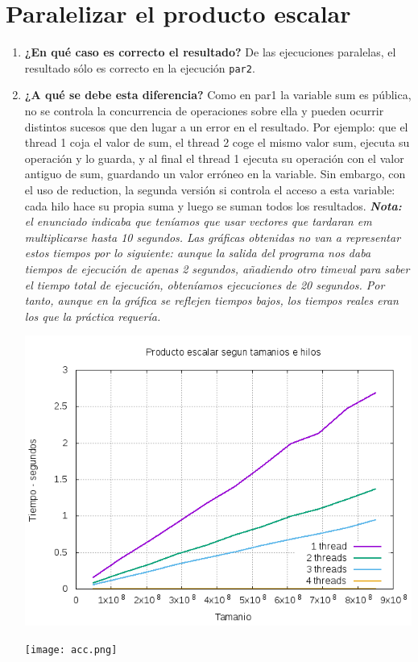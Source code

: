 \documentclass{report}
\newcommand\tab[1][0.6cm]{\hspace*{#1}}
\newcommand\nl{\newline\tab}
\begin{document}
	\newpage
	\section {Paralelizar el producto escalar}
	\begin{enumerate}
		\item{\textbf{\tab ¿En	qué	caso	es	correcto	el	resultado?	}\nl De las ejecuciones paralelas, el resultado sólo es correcto en la ejecución \texttt{par2}.
		}
		\item{\textbf{\tab ¿A	qué	se	debe	esta	diferencia?	}\nl
			Como en par1 la variable sum es pública, no se controla la concurrencia de operaciones sobre ella  y pueden ocurrir distintos sucesos que den lugar a un error en el resultado. Por ejemplo: que el thread 1 coja el valor de sum, el thread 2 coge el mismo valor sum, ejecuta su operación y lo guarda, y al final el thread 1 ejecuta su operación con el valor antiguo de sum, guardando un valor erróneo en la variable. Sin embargo, con el uso de reduction, la segunda versión si controla el acceso a esta variable: cada hilo hace su propia suma y luego se suman todos los resultados. 
		}
		\textit{\nl \newline \textbf{Nota:} el enunciado indicaba que teníamos que usar vectores que tardaran em multiplicarse hasta 10 segundos. Las gráficas obtenidas no van a representar estos tiempos por lo siguiente: aunque la salida del programa nos daba tiempos de ejecución de apenas 2 segundos, añadiendo otro timeval para saber el tiempo total de ejecución, obteníamos ejecuciones de 20 segundos. Por tanto, aunque en la gráfica se reflejen tiempos bajos, los tiempos reales eran los que la práctica requería.}
		
		\begin{center}
			\includegraphics[width=6in]{pescalar.png}
		\end{center}
		\begin{center}
			\texttt{[image: acc.png]}
		\end{center}
		

\end{enumerate}
\end{document}
